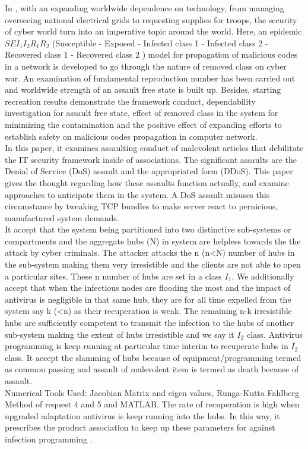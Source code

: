 In \cite{mishra2014mathematical}, with an expanding worldwide dependence on technology, from managing overseeing national electrical grids to requesting supplies for troops, the security of cyber world turn into an imperative topic around the world. Here, an epidemic $S E I_1 I_2 R_1 R_2$ (Susceptible - Exposed - Infected class 1 - Infected class 2 - Recovered class 1 - Recovered class 2 ) model for propagation of malicious codes in a network is developed to go through the nature of removed class on cyber war. An examination of fundamental reproduction number has been carried out and worldwide strength of an assault free state is built up. Besides, starting recreation results demonstrate the framework conduct, dependability investigation for assault free state, effect of removed class in the system for minimizing the contamination and the positive effect of expanding efforts to establish safety on malicious codes propagation in computer network.\\
In this paper, it examines assaulting conduct of malevolent articles that debilitate the IT security framework inside of associations. The significant assaults are the Denial of Service (DoS) assault and the appropriated form (DDoS). This paper gives the thought regarding how these assaults function actually, and examine approaches to anticipate them in the system. A DoS assault misuses this circumstance by tweaking TCP bundles to make server react to pernicious, manufactured system demands.\\
It accept that the system being partitioned into two distinctive sub-systems or compartments and the aggregate hubs (N) in system are helpless towards the the attack by cyber criminals. The attacker attacks the n (n<N) number of hubs in the sub-system making them very irresistible and the clients are not able to open a particular sites. These n number of hubs are set in a class $I_1$. We additionally accept that when the infectious nodes are flooding the most and the impact of antivirus is negligible in that same hub, they are for all time expelled from the system say k (<n) as their recuperation is weak. The remaining n-k irresistible hubs are sufficiently competent to transmit the infection to the hubs of another sub-system making the extent of hubs irresistible and we say it $I_2$ class. Antivirus programming is keep running at particular time interim to recuperate hubs in $I_2$ class. It accept the slamming of hubs because of equipment/programming termed as common passing and assault of malevolent item is termed as death because of assault.\\
Numerical Tools Used: Jacobian Matrix and eigen values, Runga-Kutta Fahlberg Method of request 4 and 5 and MATLAB.
The rate of recuperation is high when upgraded adaptation antivirus is keep running into the hubs. In this way, it prescribes the product association to keep up these parameters for against infection programming \cite{mishra2014mathematical}.

